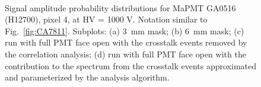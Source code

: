 \begin{figure}[hbt] 
\centering 
   \\
  \caption{Signal amplitude probability distributions for MaPMT GA0516 (H12700), pixel 4, at HV = 1000 V. Notation similar to Fig.~\ref{fig:CA7811}. Subplots: (a) 3~mm mask; (b) 6~mm mask; (c) run with full PMT face open with the crosstalk events removed by the correlation analysis; (d) run with full PMT face open with the contribution to the spectrum from the crosstalk events approximated and parameterized by the analysis algorithm.
    }
\label{fig:GA0516_1}
\end{figure}
